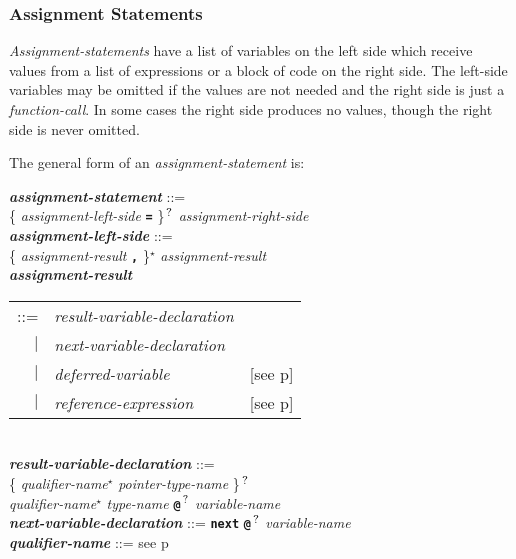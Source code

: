 \documentclass[12pt]{article}
\newcommand{\TT}[1]{{\tt \bfseries #1}}
\newcommand{\STAR}{{\Large $^\star$}}
\newcommand{\QMARK}{{$^{\,\mbox{\footnotesize ?}}$}}
\newcommand{\ttkey}[1]{{\tt \bfseries #1}}
\newcommand{\emkey}[1]{{\em \bfseries #1}}
\newcommand{\pagref}[1]{p\pageref{#1}}
\newenvironment{indpar}[1][0.3in]%
	{\begin{list}{}%
		     {\setlength{\itemsep}{0in}%
		      \setlength{\topsep}{0in}%
		      \setlength{\parsep}{1ex}%
		      \setlength{\labelwidth}{#1}%
		      \setlength{\leftmargin}{#1}%
		      \addtolength{\leftmargin}{\labelsep}}%
	 \item}%
	{\end{list}}
\begin{document}
\subsubsection{Assignment Statements}
\label{ASSIGNMENT-STATEMENTS}

{\em Assignment-statements} have a list of variables on the
left side which receive values from a list of expressions or
a block of code on the right side.  The left-side variables
may be omitted if the values are not needed and the right side
is just a {\em function-call}.  In some cases
the right side produces no values, though the right side is never omitted.

The general form of an {\em assignment-statement} is:
\begin{indpar}
\emkey{assignment-statement} ::= \\
\hspace*{0.5in} \{ {\em assignment-left-side} \TT{=} \}\QMARK{}
	      {\em assignment-right-side}
\\[0.5ex]
\emkey{assignment-left-side} ::= \\
\hspace*{0.5in}
    \{ {\em assignment-result} \TT{,} \}\STAR{}
    {\em assignment-result}
\\[0.5ex]
\emkey{assignment-result}
    \begin{tabular}[t]{@{}rll}
    ::= & {\em result-variable-declaration} \\
    $|$ & {\em next-variable-declaration} \\
    $|$ & {\em deferred-variable}
    		& [see \pagref{DEFERRED-VARIABLE}] \\
    $|$ & {\em reference-expression}
    		& [see \pagref{REFERENCE-EXPRESSIONS}] \\
    \end{tabular}
\\[0.5ex]
\emkey{result-variable-declaration}\label{RESULT-VARIABLE-DECLARATION} ::= \\
\hspace*{0.5in}
        \{ {\em qualifier-name}\STAR{} {\em pointer-type-name} \}\QMARK{} \\
\hspace*{1.0in}
        {\em qualifier-name}\STAR{} {\em type-name}
        \TT{@}\QMARK{} {\em variable-name}
\\[0.5ex]
\emkey{next-variable-declaration}\label{NEXT-VARIABLE-DECLARATION}
    ::= \ttkey{next} \TT{@}\QMARK{} {\em variable-name}
\\[0.5ex]
\emkey{qualifier-name} ::= see \pagref{QUALIFIER-NAME}

\end{indpar}
\end{document}
